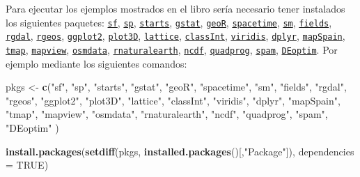 \documentclass[
]{book}
\newenvironment{Shaded}{\begin{snugshade}}{\end{snugshade}}
\newcommand{\AttributeTok}[1]{\textcolor[rgb]{0.13,0.29,0.53}{#1}}
\newcommand{\ConstantTok}[1]{\textcolor[rgb]{0.56,0.35,0.01}{#1}}
\newcommand{\FunctionTok}[1]{\textcolor[rgb]{0.13,0.29,0.53}{\textbf{#1}}}
\newcommand{\NormalTok}[1]{#1}
\newcommand{\OtherTok}[1]{\textcolor[rgb]{0.56,0.35,0.01}{#1}}
\newcommand{\StringTok}[1]{\textcolor[rgb]{0.31,0.60,0.02}{#1}}
\theoremstyle{break}
\theoremstyle{definition}
\theoremstyle{definition}
\theoremstyle{definition}
\theoremstyle{definition}
\theoremstyle{remark}
\begin{document}
Para ejecutar los ejemplos mostrados en el libro sería necesario tener instalados los siguientes paquetes:
\href{https://CRAN.R-project.org/package=sf}{\texttt{sf}}, \href{https://CRAN.R-project.org/package=sp}{\texttt{sp}}, \href{https://CRAN.R-project.org/package=starts}{\texttt{starts}}, \href{https://CRAN.R-project.org/package=gstat}{\texttt{gstat}}, \href{https://CRAN.R-project.org/package=geoR}{\texttt{geoR}}, \href{https://CRAN.R-project.org/package=spacetime}{\texttt{spacetime}}, \href{https://CRAN.R-project.org/package=sm}{\texttt{sm}}, \href{https://CRAN.R-project.org/package=fields}{\texttt{fields}}, \href{https://CRAN.R-project.org/package=rgdal}{\texttt{rgdal}}, \href{https://CRAN.R-project.org/package=rgeos}{\texttt{rgeos}}, \href{https://CRAN.R-project.org/package=ggplot2}{\texttt{ggplot2}}, \href{https://CRAN.R-project.org/package=plot3D}{\texttt{plot3D}}, \href{https://CRAN.R-project.org/package=lattice}{\texttt{lattice}}, \href{https://CRAN.R-project.org/package=classInt}{\texttt{classInt}}, \href{https://CRAN.R-project.org/package=viridis}{\texttt{viridis}}, \href{https://CRAN.R-project.org/package=dplyr}{\texttt{dplyr}}, \href{https://CRAN.R-project.org/package=mapSpain}{\texttt{mapSpain}}, \href{https://CRAN.R-project.org/package=tmap}{\texttt{tmap}}, \href{https://CRAN.R-project.org/package=mapview}{\texttt{mapview}}, \href{https://CRAN.R-project.org/package=osmdata}{\texttt{osmdata}}, \href{https://CRAN.R-project.org/package=rnaturalearth}{\texttt{rnaturalearth}}, \href{https://CRAN.R-project.org/package=ncdf}{\texttt{ncdf}}, \href{https://CRAN.R-project.org/package=quadprog}{\texttt{quadprog}}, \href{https://CRAN.R-project.org/package=spam}{\texttt{spam}}, \href{https://CRAN.R-project.org/package=DEoptim}{\texttt{DEoptim}}.
Por ejemplo mediante los siguientes comandos:

\begin{Shaded}
\begin{Highlighting}[]
\NormalTok{pkgs }\OtherTok{\textless{}{-}} \FunctionTok{c}\NormalTok{(}\StringTok{"sf"}\NormalTok{, }\StringTok{"sp"}\NormalTok{, }\StringTok{"starts"}\NormalTok{, }\StringTok{"gstat"}\NormalTok{, }\StringTok{"geoR"}\NormalTok{, }\StringTok{"spacetime"}\NormalTok{, }\StringTok{"sm"}\NormalTok{, }\StringTok{"fields"}\NormalTok{, }
          \StringTok{"rgdal"}\NormalTok{, }\StringTok{"rgeos"}\NormalTok{, }\StringTok{"ggplot2"}\NormalTok{, }\StringTok{"plot3D"}\NormalTok{, }\StringTok{"lattice"}\NormalTok{, }
          \StringTok{"classInt"}\NormalTok{, }\StringTok{"viridis"}\NormalTok{, }\StringTok{"dplyr"}\NormalTok{, }\StringTok{"mapSpain"}\NormalTok{, }\StringTok{"tmap"}\NormalTok{, }\StringTok{"mapview"}\NormalTok{, }
          \StringTok{"osmdata"}\NormalTok{, }\StringTok{"rnaturalearth"}\NormalTok{, }\StringTok{"ncdf"}\NormalTok{, }\StringTok{"quadprog"}\NormalTok{, }\StringTok{"spam"}\NormalTok{, }\StringTok{"DEoptim"}\NormalTok{ )}

\FunctionTok{install.packages}\NormalTok{(}\FunctionTok{setdiff}\NormalTok{(pkgs, }\FunctionTok{installed.packages}\NormalTok{()[,}\StringTok{"Package"}\NormalTok{]), }\AttributeTok{dependencies =} \ConstantTok{TRUE}\NormalTok{)}
\end{Highlighting}
\end{Shaded}
\end{document}
